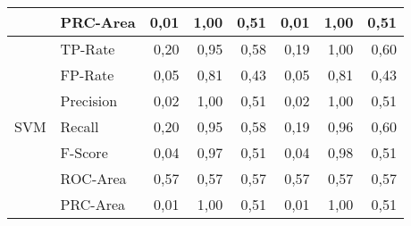 \documentclass[master,twoside,extern,palatino]{rgseThesis}
\begin{document}
\begin{table}[ht]
{\begin{tabular}{|ll|rrr|rrr|}
                     & PRC-Area  & 0,01             & 1,00                 & 0,51                     & 0,01             & 1,00                 & 0,51                      \\ 
\hline
\multirow{7}{*}{SVM} & TP-Rate   & 0,20             & 0,95                 & 0,58                     & 0,19             & 1,00                 & 0,60                      \\
                     & FP-Rate   & 0,05             & 0,81                 & 0,43                     & 0,05             & 0,81                 & 0,43                      \\
                     & Precision & 0,02             & 1,00                 & 0,51                     & 0,02             & 1,00                 & 0,51                      \\
                     & Recall    & 0,20             & 0,95                 & 0,58                     & 0,19             & 0,96                 & 0,60                      \\
                     & F-Score   & 0,04             & 0,97                 & 0,51                     & 0,04             & 0,98                 & 0,51                      \\
                     & ROC-Area  & 0,57             & 0,57                 & 0,57                     & 0,57             & 0,57                 & 0,57                      \\
                     & PRC-Area  & 0,01             & 1,00                 & 0,51                     & 0,01             & 1,00                 & 0,51                      \\
\hline
\end{tabular}
}
\end{table}
\end{document}
